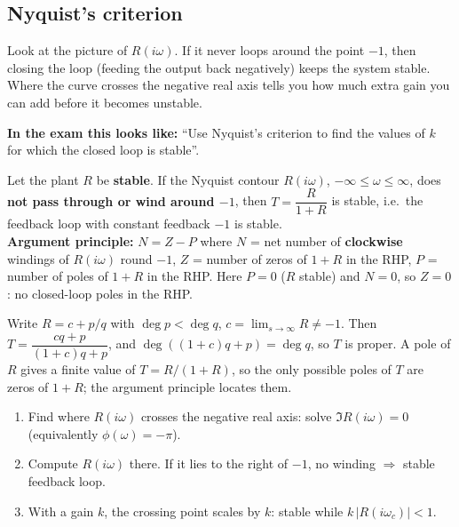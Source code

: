\subsection{Nyquist's criterion \texorpdfstring{}{}}\label{ss:5-3}
\begin{plainbox}
Look at the picture of $R(i\omega)$. If it never loops around the point $-1$, then closing the loop (feeding the output back
negatively) keeps the system stable. Where the curve crosses the negative real axis tells you how much extra gain you can add
before it becomes unstable.
\par\smallskip\textbf{In the exam this looks like:} ``Use Nyquist's criterion to find the values of $k$ for which the closed loop is stable''.
\end{plainbox}
\begin{thmbox}[title={Nyquist's criterion}]
Let the plant $R$ be \textbf{stable}. If the Nyquist contour $R(i\omega)$, $-\infty\le\omega\le\infty$, does \textbf{not pass through or wind around $-1$}, then
$T=\dfrac{R}{1+R}$ is stable, i.e.\ the feedback loop with constant feedback $-1$ is stable.\\
\textbf{Argument principle:} $N=Z-P$ where $N$ = net number of \textbf{clockwise} windings of $R(i\omega)$ round $-1$, $Z$ = number of zeros of $1+R$ in the RHP, $P$ = number of poles of $1+R$ in the RHP.
Here $P=0$ ($R$ stable) and $N=0$, so $Z=0$: no closed-loop poles in the RHP.
\end{thmbox}
\begin{proofbox}[title={Why $T$ is proper and where its poles can be \fr{175}}]
Write $R=c+p/q$ with $\deg p<\deg q$, $c=\lim_{s\to\infty}R\neq-1$. Then $T=\dfrac{cq+p}{(1+c)q+p}$, and $\deg((1+c)q+p)=\deg q$, so $T$ is proper.
A pole of $R$ gives a finite value of $T=R/(1+R)$, so the only possible poles of $T$ are zeros of $1+R$; the argument principle locates them.
\end{proofbox}
\begin{methodbox}[title={Method: use Nyquist to find a gain margin}]
\begin{enumerate}
\item Find where $R(i\omega)$ crosses the negative real axis: solve $\Im R(i\omega)=0$ (equivalently $\phi(\omega)=-\pi$).
\item Compute $R(i\omega)$ there. If it lies to the right of $-1$, no winding $\Rightarrow$ stable feedback loop.
\item With a gain $k$, the crossing point scales by $k$: stable while $k\,|R(i\omega_c)|<1$.
\end{enumerate}
\end{methodbox}
